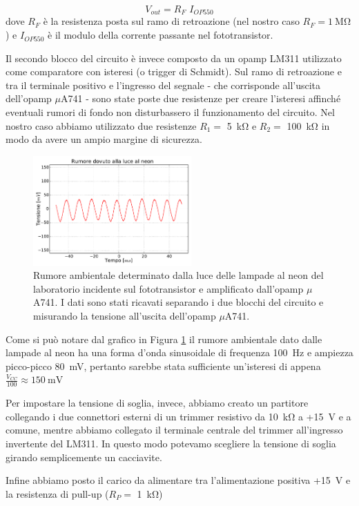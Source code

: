 \begin{equation}
	V_{out} = R_F \,\, I_{OP550}
\end{equation}
dove $R_F$ è la resistenza posta sul ramo di retroazione (nel nostro caso $R_F = \SI{1}{\Mohm}$) e $I_{OP550}$ è il modulo della corrente passante nel fototransistor.

Il secondo blocco del circuito è invece composto da un opamp LM311 utilizzato come comparatore con isteresi (o trigger di Schmidt).
Sul ramo di retroazione e tra il terminale positivo e l'ingresso del segnale - che corrisponde all'uscita dell'opamp $\mu$A741 - sono state poste due resistenze per creare l'isteresi affinché eventuali rumori di fondo non disturbassero il funzionamento del circuito.
Nel nostro caso abbiamo utilizzato due resistenze $R_1 =$ \SI{5}{\kohm} e $R_2=$ \SI{100}{\kohm} in modo da avere un ampio margine di sicurezza.

\begin{figure}
	\begin{center}
		\includegraphics[width=0.54\textwidth]{../E04/latex/neon.pdf}
	\end{center}
	\caption{Rumore ambientale determinato dalla luce delle lampade al neon del laboratorio incidente sul fototransistor e amplificato dall'opamp $\mu$A741. I dati sono stati ricavati separando i due blocchi del circuito e misurando la tensione all'uscita dell'opamp $\mu$A741.}
	\label{gr4:neon}
\end{figure}

Come si può notare dal grafico in Figura \ref{gr4:neon} il rumore ambientale dato dalle lampade al neon ha una forma d'onda sinusoidale di frequenza \SI{100}{\hertz} e ampiezza picco-picco \SI{80}{\mV}, pertanto sarebbe stata sufficiente un'isteresi di appena $\frac{V_{CC}}{100} \approx \SI{150}{\mV}$

Per impostare la tensione di soglia, invece, abbiamo creato un partitore collegando i due connettori esterni di un trimmer resistivo da \SI{10}{\kohm} a +\SI{15}{\V} e a comune, mentre abbiamo collegato il terminale centrale del trimmer all'ingresso invertente del LM311.
In questo modo potevamo scegliere la tensione di soglia girando semplicemente un cacciavite.

Infine abbiamo posto il carico da alimentare tra l'alimentazione positiva +\SI{15}{\V} e la resistenza di pull-up ($R_P=$ \SI{1}{\kohm})
